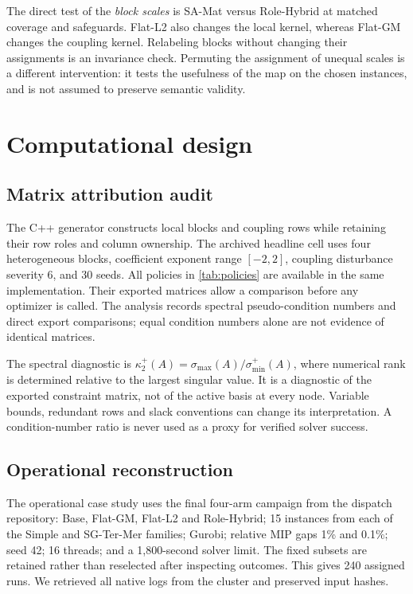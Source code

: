 \documentclass[11pt]{article}
\theoremstyle{definition}
\theoremstyle{remark}
\begin{document}
The direct test of the \emph{block scales} is SA-Mat versus Role-Hybrid at matched
coverage and safeguards. Flat-L2 also changes the local kernel, whereas Flat-GM changes
the coupling kernel. Relabeling blocks without changing their assignments is an
invariance check. Permuting the assignment of unequal scales is a different intervention:
it tests the usefulness of the map on the chosen instances, and is not assumed to
preserve semantic validity.




\section{Computational design}
\label{sec:experiments}
\subsection{Matrix attribution audit}
The C++ generator constructs local blocks and coupling rows while retaining their row
roles and column ownership. The archived headline cell uses four heterogeneous blocks,
coefficient exponent range $[-2,2]$, coupling disturbance severity $6$, and 30 seeds.
All policies in \cref{tab:policies} are available in the same implementation. Their
exported matrices allow a comparison before any optimizer is called. The analysis
records spectral pseudo-condition numbers and direct export comparisons; equal
condition numbers alone are not evidence of identical matrices.

The spectral diagnostic is $\kappa_2^+(A)=\sigma_{\max}(A)/\sigma_{\min}^+(A)$,
where numerical rank is determined relative to the largest singular value. It is a
diagnostic of the exported constraint matrix, not of the active basis at every node.
Variable bounds, redundant rows and slack conventions can change its interpretation.
A condition-number ratio is never used as a proxy for verified solver success.

\subsection{Operational reconstruction}
The operational case study uses the final four-arm campaign from the dispatch
repository: Base, Flat-GM, Flat-L2 and Role-Hybrid; 15 instances from each of the
Simple and SG-Ter-Mer families; Gurobi; relative MIP gaps 1\% and 0.1\%; seed 42;
16 threads; and a 1,800-second solver limit. The fixed subsets are retained rather
than reselected after inspecting outcomes. This gives 240 assigned runs. We retrieved
all native logs from the cluster and preserved input hashes.
\end{document}
